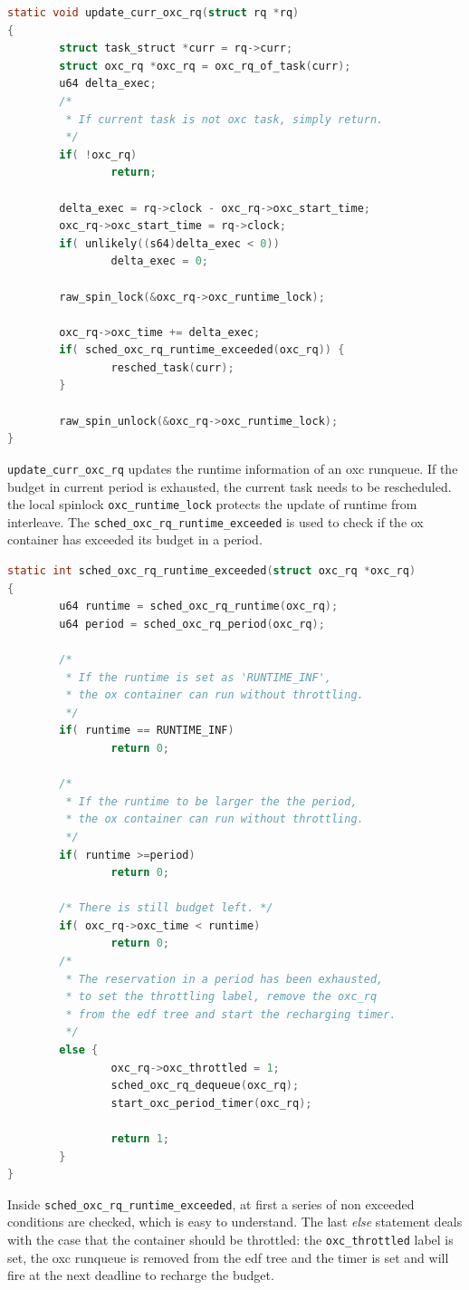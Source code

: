 \begin{lstlisting}[language=C, 
		caption={Update an ox container's runtime information}]
static void update_curr_oxc_rq(struct rq *rq)
{
        struct task_struct *curr = rq->curr;
        struct oxc_rq *oxc_rq = oxc_rq_of_task(curr);
        u64 delta_exec;
        /*
         * If current task is not oxc task, simply return.
         */
        if( !oxc_rq)
                return;

        delta_exec = rq->clock - oxc_rq->oxc_start_time;
        oxc_rq->oxc_start_time = rq->clock;
        if( unlikely((s64)delta_exec < 0))
                delta_exec = 0;

        raw_spin_lock(&oxc_rq->oxc_runtime_lock);

        oxc_rq->oxc_time += delta_exec;
        if( sched_oxc_rq_runtime_exceeded(oxc_rq)) {
                resched_task(curr);
        }

        raw_spin_unlock(&oxc_rq->oxc_runtime_lock);
}
\end{lstlisting}
\texttt{update\_curr\_oxc\_rq} updates the runtime information of 
an oxc runqueue. If the budget in current period is exhausted, the
current task needs to be rescheduled. the local spinlock 
\texttt{oxc\_runtime\_lock} protects the update of runtime from
interleave. The \texttt{sched\_oxc\_rq\_runtime\_exceeded} is
used to check if the ox container has exceeded its budget in a
period.
\begin{lstlisting}[language=C, 
	caption={Check if an ox container should be throttled}]
static int sched_oxc_rq_runtime_exceeded(struct oxc_rq *oxc_rq)
{
        u64 runtime = sched_oxc_rq_runtime(oxc_rq);
        u64 period = sched_oxc_rq_period(oxc_rq);

        /* 
         * If the runtime is set as 'RUNTIME_INF',
         * the ox container can run without throttling.
         */
        if( runtime == RUNTIME_INF)
                return 0;

        /* 
         * If the runtime to be larger the the period,
         * the ox container can run without throttling.
         */
        if( runtime >=period)
                return 0;

        /* There is still budget left. */
        if( oxc_rq->oxc_time < runtime)
                return 0;
        /* 
         * The reservation in a period has been exhausted,
         * to set the throttling label, remove the oxc_rq
         * from the edf tree and start the recharging timer.
         */
        else {
                oxc_rq->oxc_throttled = 1;
                sched_oxc_rq_dequeue(oxc_rq);
                start_oxc_period_timer(oxc_rq);

                return 1;
        }
}
\end{lstlisting}
Inside \texttt{sched\_oxc\_rq\_runtime\_exceeded}, at first
a series of non exceeded conditions are checked, which is 
easy to understand. The last \emph{else} statement deals with
the case that the container should be throttled: the 
\texttt{oxc\_throttled} label is set, the oxc runqueue is removed 
from the edf tree and the timer is set and will fire at the next 
deadline to recharge the budget.

